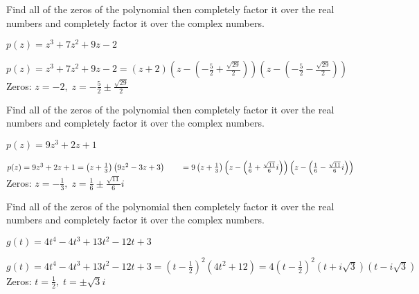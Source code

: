 \documentclass{ximera}
\begin{document}
\begin{problem}
Find all of the zeros of the polynomial then completely factor it over the real numbers and completely factor it over the complex numbers.

$p(z) = z^3 + 7z^2+9z-2$

\begin{solution}
$p(z) = z^3 + 7z^2+9z-2 = (z+2) \left(z - \left( -\frac{5}{2}+\frac{\sqrt{29}}{2}\right) \right) \left(z - \left( -\frac{5}{2}-\frac{\sqrt{29}}{2}\right) \right)$ \\
Zeros:  $z = -2, \; z = -\frac{5}{2} \pm \frac{\sqrt{29}}{2}$
\end{solution}

\end{problem}

\begin{problem}
Find all of the zeros of the polynomial then completely factor it over the real numbers and completely factor it over the complex numbers.

$p(z) = 9z^3+2z+1$

\begin{solution}
$p(z) = 9z^3+2z+1 = \left(z + \frac{1}{3}\right) \left(9z^2 - 3z + 3\right) \\
\phantom{f(z)}= 9\left(z + \frac{1}{3}\right) \left(z - \left(\frac{1}{6} + \frac{\sqrt{11}}{6} i \right) \right) \left(z - \left(\frac{1}{6} - \frac{\sqrt{11}}{6} i \right) \right)$\\
Zeros:  $z = -\frac{1}{3}, \; z = \frac{1}{6} \pm \frac{\sqrt{11}}{6} i$
\end{solution}

\end{problem}

\begin{problem}
Find all of the zeros of the polynomial then completely factor it over the real numbers and completely factor it over the complex numbers.

$g(t) = 4t^{4} - 4t^{3} + 13t^{2} - 12t + 3$

\begin{solution}
$g(t) = 4t^{4} - 4t^{3} + 13t^{2} - 12t + 3 = \left(t - \frac{1}{2}\right)^{2}\left(4t^{2} + 12\right) = 4\left(t - \frac{1}{2}\right)^{2}(t + i\sqrt{3})(t - i\sqrt{3})$\\
Zeros: $t = \frac{1}{2}, \; t = \pm \sqrt{3}i$
\end{solution}

\end{problem}
\end{document}

